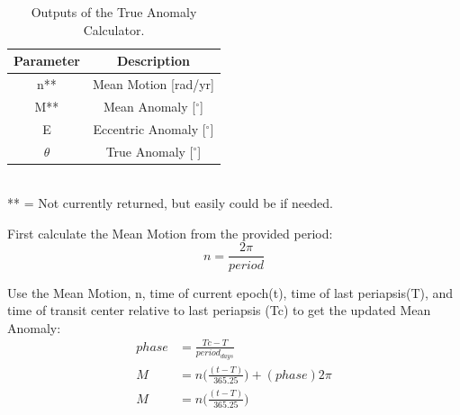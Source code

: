 \documentclass[10pt,preprint]{aastex}
\begin{document}

\begin{table}[h]
\centering
\caption{ Outputs of the True Anomaly Calculator.}
\begin{tabular}{c c}
\hline\hline
Parameter & Description \\
\hline
n** & Mean Motion [rad/yr] \\
M** & Mean Anomaly [$^{\circ}$]\\
E & Eccentric Anomaly [$^{\circ}$]\\
$\theta$ & True Anomaly [$^{\circ}$]\\
\hline
\end{tabular}
\\
 ** = Not currently returned, but easily could be if needed.
\end{table}


First calculate the Mean Motion from the provided period:
\begin{equation}\label{eq:4.1.1}
n = \frac{2\pi}{period} 
\end{equation}

Use the Mean Motion, n, time of current epoch(t), time of last periapsis(T), and time of transit center relative to last periapsis (Tc) to get the updated Mean Anomaly:
\begin{subequations}\label{eq:RV-Ma}
\begin{align}
phase& = \frac{Tc-T}{period_{days}} \\
\label{eq:RV-Mb}
M& = n \bigg( \frac{(t-T)}{365.25} \bigg)+(phase)2\pi\\
\label{eq:4.1.2}
M& = n \bigg( \frac{(t-T)}{365.25} \bigg)
\end{align}
\end{subequations}
\end{document}
